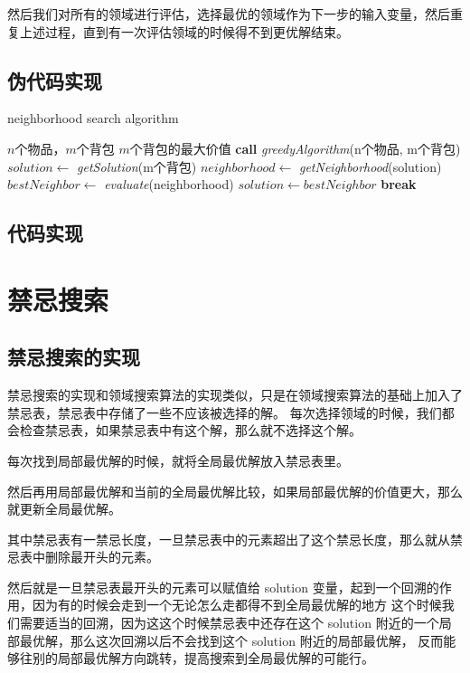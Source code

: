 \documentclass[UTF8]{ctexart}
\begin{document}
然后我们对所有的领域进行评估，选择最优的领域作为下一步的输入变量，然后重复上述过程，直到有一次评估领域的时候得不到更优解结束。

\subsection{伪代码实现}
\begin{algorithm}
    \caption{neighborhood search algorithm}
    \label{alg3}
    \begin{algorithmic}[1]
        \REQUIRE $n$个物品，$m$个背包
        \ENSURE $m$个背包的最大价值
        \STATE \textbf{call} \textit{greedyAlgorithm}(n个物品, m个背包)
        \STATE $solution \gets $ \textit{getSolution}(m个背包)
        \STATE $neighborhood \gets $ \textit{getNeighborhood}(solution)
        \STATE $bestNeighbor \gets $ \textit{evaluate}(neighborhood)
        \STATE $solution \gets bestNeighbor$
        \ELSE
        \STATE \textbf{break}
        \ENDIF
        \ENDWHILE
    \end{algorithmic}
\end{algorithm}

\subsection{代码实现}


\section{禁忌搜索}
\subsection{禁忌搜索的实现}
禁忌搜索的实现和领域搜索算法的实现类似，只是在领域搜索算法的基础上加入了禁忌表，禁忌表中存储了一些不应该被选择的解。
每次选择领域的时候，我们都会检查禁忌表，如果禁忌表中有这个解，那么就不选择这个解。

每次找到局部最优解的时候，就将全局最优解放入禁忌表里。

然后再用局部最优解和当前的全局最优解比较，如果局部最优解的价值更大，那么就更新全局最优解。

其中禁忌表有一禁忌长度，一旦禁忌表中的元素超出了这个禁忌长度，那么就从禁忌表中删除最开头的元素。

然后就是一旦禁忌表最开头的元素可以赋值给 solution 变量，起到一个回溯的作用，因为有的时候会走到一个无论怎么走都得不到全局最优解的地方
这个时候我们需要适当的回溯，因为这这个时候禁忌表中还存在这个 solution 附近的一个局部最优解，那么这次回溯以后不会找到这个 solution 附近的局部最优解，
反而能够往别的局部最优解方向跳转，提高搜索到全局最优解的可能行。
\end{document}
